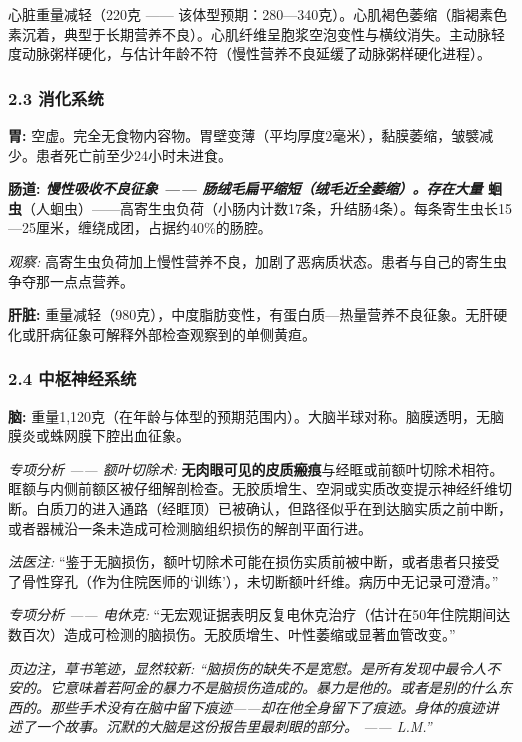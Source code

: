 \noindent 心脏重量减轻（220克 —— 该体型预期：280—340克）。心肌褐色萎缩（脂褐素色素沉着，典型于长期营养不良）。心肌纤维呈胞浆空泡变性与横纹消失。主动脉轻度动脉粥样硬化，与估计年龄不符（慢性营养不良延缓了动脉粥样硬化进程）。

\subsubsection*{2.3 消化系统}

\noindent \textbf{胃:} 空虚。完全无食物内容物。胃壁变薄（平均厚度2毫米），黏膜萎缩，皱襞减少。患者死亡前至少24小时未进食。

\noindent \textbf{肠道:\textit{ 慢性吸收不良征象 —— 肠绒毛扁平缩短（绒毛近全萎缩）。存在大量 }蛔虫}（人蛔虫）——高寄生虫负荷（小肠内计数17条，升结肠4条）。每条寄生虫长15—25厘米，缠绕成团，占据约40\%的肠腔。

\noindent \textit{观察:} 高寄生虫负荷加上慢性营养不良，加剧了恶病质状态。患者与自己的寄生虫争夺那一点点营养。

\noindent \textbf{肝脏:} 重量减轻（980克），中度脂肪变性，有蛋白质—热量营养不良征象。无肝硬化或肝病征象可解释外部检查观察到的单侧黄疸。

\subsubsection*{2.4 中枢神经系统}

\noindent \textbf{脑:} 重量1,120克（在年龄与体型的预期范围内）。大脑半球对称。脑膜透明，无脑膜炎或蛛网膜下腔出血征象。

\noindent \textit{专项分析 —— 额叶切除术:} \textbf{无肉眼可见的皮质瘢痕}与经眶或前额叶切除术相符。眶额与内侧前额区被仔细解剖检查。无胶质增生、空洞或实质改变提示神经纤维切断。白质刀的进入通路（经眶顶）已被确认，但路径似乎在到达脑实质之前中断，或者器械沿一条未造成可检测脑组织损伤的解剖平面行进。

\noindent \textit{法医注:} “鉴于无脑损伤，额叶切除术可能在损伤实质前被中断，或者患者只接受了骨性穿孔（作为住院医师的‘训练’），未切断额叶纤维。病历中无记录可澄清。”

\noindent \textit{专项分析 —— 电休克:} “无宏观证据表明反复电休克治疗（估计在50年住院期间达数百次）造成可检测的脑损伤。无胶质增生、叶性萎缩或显著血管改变。”

\noindent \textit{页边注，草书笔迹，显然较新:\textit{ “脑损伤的缺失不是宽慰。是所有发现中最令人不安的。它意味着若阿金的暴力不是脑损伤造成的。暴力是}他\textit{的。或者是}别的什么东西\textit{的。那些手术没有在脑中留下痕迹——却在他全身留下了痕迹。身体的痕迹讲述了一个故事。沉默的大脑是这份报告里最刺眼的部分。 —— L.M.”}}

